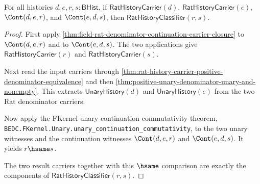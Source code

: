 \begin{theorem}
\label{thm:field-rat-denominator-continuation-commutative-classifier}
For all histories $d,e,r,s:\mathsf{BHist}$, if
$\mathsf{RatHistoryCarrier}(d)$, $\mathsf{RatHistoryCarrier}(e)$,
$\Cont(d,e,r)$, and $\Cont(e,d,s)$, then
$\mathsf{RatHistoryClassifier}(r,s)$.
\end{theorem}
\begin{proof}
First apply
\autoref{thm:field-rat-denominator-continuation-carrier-closure} to
$\Cont(d,e,r)$ and to $\Cont(e,d,s)$. The two applications give
$\mathsf{RatHistoryCarrier}(r)$ and $\mathsf{RatHistoryCarrier}(s)$.

Next read the input carriers through
\autoref{thm:rat-history-carrier-positive-denominator-equivalence} and then
\autoref{thm:positive-unary-denominator-unary-and-nonempty}. This extracts
$\mathsf{UnaryHistory}(d)$ and $\mathsf{UnaryHistory}(e)$ from the two Rat
denominator carriers.

Now apply the FKernel unary continuation commutativity theorem,
\texttt{BEDC.FKernel.Unary.unary\_continuation\_commutativity}, to the two
unary witnesses and the continuation witnesses $\Cont(d,e,r)$ and
$\Cont(e,d,s)$. It yields $r\hsame s$.

The two result carriers together with this $\hsame$ comparison are exactly the
components of $\mathsf{RatHistoryClassifier}(r,s)$.
\end{proof}


